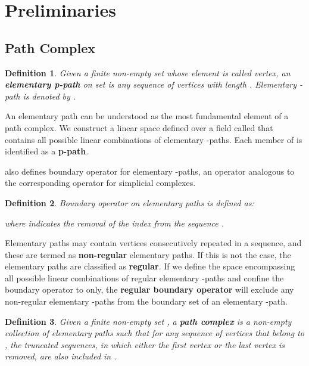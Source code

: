 \documentclass[letterpaper]{article} \usepackage{aaai24}  \usepackage{times}  \usepackage{helvet}  \usepackage{courier}  \usepackage[hyphens]{url}  \usepackage{graphicx} \urlstyle{rm} \def\UrlFont{\rm}  \usepackage{natbib}  \usepackage{caption} \frenchspacing  \setlength{\pdfpagewidth}{8.5in} \setlength{\pdfpageheight}{11in} \usepackage{algorithm}
\newtheorem{definition}{Definition}
\begin{document}
\section{Preliminaries} \label{section:prelim}

\subsection{Path Complex} \label{subsec:path-complex}

\begin{definition}{\cite{grigoryan_homologies_2013, grigoryan_path_2020}}
Given a finite non-empty set  whose element is called vertex, an \textbf{elementary p-path} on set  is any sequence of vertices with length . Elementary -path is denoted by .
\end{definition}

An elementary path can be understood as the most fundamental element of a path complex. We construct a linear space defined over a field  called  that contains all possible linear combinations of elementary -paths. Each member of  is identified as a \textbf{p-path}.

\citeauthor{grigoryan_homologies_2013} also defines boundary operator   for elementary -paths, an operator analogous to the corresponding operator for simplicial complexes.

\begin{definition}{\cite{grigoryan_homologies_2013, grigoryan_path_2020}}
Boundary operator on elementary paths is defined as:

where  indicates the removal of the index  from the sequence .
\end{definition}

Elementary paths may contain vertices consecutively repeated in a sequence, and these are termed as \textbf{non-regular} elementary paths. If this is not the case, the elementary paths are classified as \textbf{regular}. If we define  the space encompassing all possible linear combinations of regular elementary -paths and confine the boundary operator to  only, the \textbf{regular boundary operator}  will exclude any non-regular elementary -paths from the boundary set of an elementary -path.

 \begin{definition}{\cite{grigoryan_homologies_2013, grigoryan_path_2020}}
Given a finite non-empty set , a \textbf{path complex}  is a non-empty collection of elementary paths such that for any sequence of vertices that belong to , the truncated sequences, in which either the first vertex or the last vertex is removed, are also included in .
 \end{definition}
\end{document}
